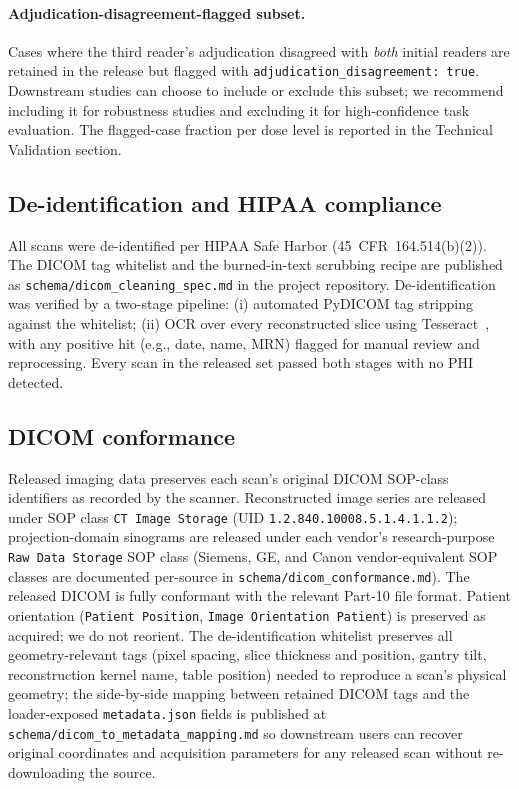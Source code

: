 \documentclass[twoside,11pt]{article}
\begin{document}
\paragraph{Adjudication-disagreement-flagged subset.} Cases where the third reader's adjudication disagreed with \textit{both} initial readers are retained in the release but flagged with \texttt{adjudication\_disagreement: true}. Downstream studies can choose to include or exclude this subset; we recommend including it for robustness studies and excluding it for high-confidence task evaluation. The flagged-case fraction per dose level is reported in the Technical Validation section.

\subsection*{De-identification and HIPAA compliance}

All scans were de-identified per HIPAA Safe Harbor (45~CFR~164.514(b)(2)). The DICOM tag whitelist and the burned-in-text scrubbing recipe are published as \texttt{schema/dicom\_cleaning\_spec.md} in the project repository. De-identification was verified by a two-stage pipeline: (i) automated PyDICOM tag stripping against the whitelist; (ii) OCR over every reconstructed slice using Tesseract~\citep{tesseract2007}, with any positive hit (e.g., date, name, MRN) flagged for manual review and reprocessing. Every scan in the released set passed both stages with no PHI detected.

\subsection*{DICOM conformance}

Released imaging data preserves each scan's original DICOM SOP-class identifiers as recorded by the scanner. Reconstructed image series are released under SOP class \texttt{CT Image Storage} (UID \texttt{1.2.840.10008.5.1.4.1.1.2}); projection-domain sinograms are released under each vendor's research-purpose \texttt{Raw Data Storage} SOP class (Siemens, GE, and Canon vendor-equivalent SOP classes are documented per-source in \texttt{schema/dicom\_conformance.md}). The released DICOM is fully conformant with the relevant Part-10 file format. Patient orientation (\texttt{Patient Position}, \texttt{Image Orientation Patient}) is preserved as acquired; we do not reorient. The de-identification whitelist preserves all geometry-relevant tags (pixel spacing, slice thickness and position, gantry tilt, reconstruction kernel name, table position) needed to reproduce a scan's physical geometry; the side-by-side mapping between retained DICOM tags and the loader-exposed \texttt{metadata.json} fields is published at \texttt{schema/dicom\_to\_metadata\_mapping.md} so downstream users can recover original coordinates and acquisition parameters for any released scan without re-downloading the source.
\end{document}
